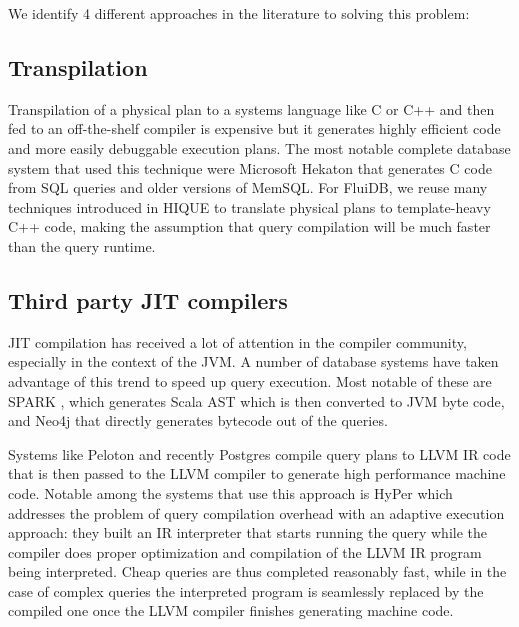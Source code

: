We identify 4 different approaches in the literature to solving this
problem:

\subsection{Transpilation}
\label{sec:transpilation}

Transpilation of a physical plan to a systems language like C or C++
and then fed to an off-the-shelf compiler
\cite{krikellasGeneratingCodeHolistic2010} is expensive but it
generates highly efficient code and more easily debuggable execution
plans. The most notable complete database system that used this
technique were Microsoft Hekaton that generates C code from SQL
queries and older versions of MemSQL. For FluiDB, we reuse many
techniques introduced in HIQUE
\cite{krikellasGeneratingCodeHolistic2010} to translate physical plans
to template-heavy C++ code, making the assumption that query
compilation will be much faster than the query runtime.

\subsection{Third party JIT compilers}

JIT compilation has received a lot of attention in the compiler
community, especially in the context of the JVM. A number of database
systems have taken advantage of this trend to speed up query execution. Most
notable of these are SPARK \cite{armbrustSparkSQLRelational2015}, which
generates Scala AST which is then converted to JVM byte code, and
Neo4j that directly generates bytecode out of the queries.

Systems like Peloton \cite{menonRelaxedOperatorFusion2017} and
recently Postgres \cite{sharyginQueryCompilationPostgreSQL2017}
compile query plans to LLVM IR code that is then passed to the LLVM
compiler to generate high performance machine code. Notable among the
systems that use this approach is HyPer
\cite{neumannEvolutionCompilingQueryEngine} which addresses the
problem of query compilation overhead with an adaptive execution
approach: they built an IR interpreter that starts running the query
while the compiler does proper optimization and compilation of the
LLVM IR program being interpreted. Cheap queries are thus completed
reasonably fast, while in the case of complex queries the interpreted
program is seamlessly replaced by the compiled one once the LLVM
compiler finishes generating machine code.

